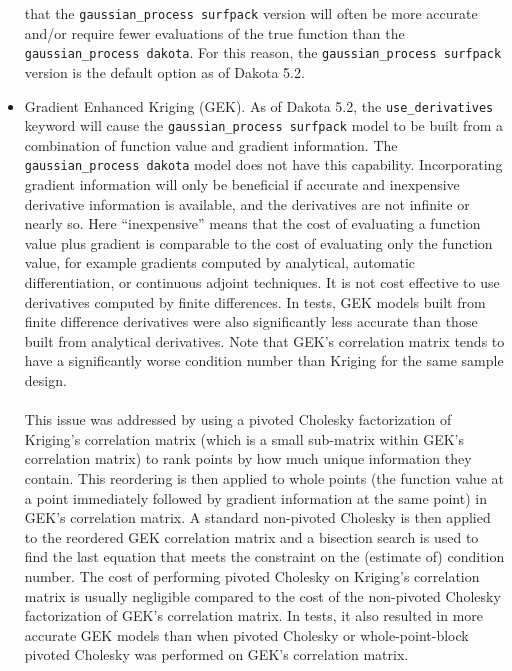 \begin{itemize}
      that the \texttt{gaussian\_process surfpack} version will often be
      more accurate and/or require fewer evaluations of the true function 
      than the \texttt{gaussian\_process dakota}.  For this reason, the
      \texttt{gaussian\_process surfpack} version is the default 
      option as of Dakota 5.2. 
\item Gradient Enhanced Kriging (GEK). As of Dakota 5.2, the 
      \texttt{use\_derivatives}  keyword will cause the 
      \texttt{gaussian\_process surfpack} model to be built from a 
      combination of function value and gradient information.  The 
      \texttt{gaussian\_process dakota} model does not have this 
      capability.  Incorporating gradient information will only be 
      beneficial if accurate and inexpensive derivative information is 
      available, and the derivatives are not infinite or nearly so.  Here 
      ``inexpensive'' means that the cost of evaluating a function value 
      plus gradient is comparable to the cost of evaluating only the 
      function value, for example gradients computed by analytical, 
      automatic differentiation, or continuous adjoint techniques. It is 
      not cost effective to use derivatives computed by finite differences.
      In tests, GEK models built from finite difference derivatives were 
      also significantly less accurate than those built from analytical 
      derivatives.  Note that GEK's correlation matrix tends to have a 
      significantly worse condition number than Kriging for the same 
      sample design.\\ \\
      This issue was addressed by using a pivoted Cholesky 
      factorization of Kriging's correlation matrix (which is a small 
      sub-matrix within GEK's correlation matrix) to rank points by how 
      much unique information they contain. This reordering is then 
      applied to whole points (the function value at a point immediately 
      followed by gradient information at the same point) in GEK's 
      correlation matrix.  A standard non-pivoted Cholesky is then 
      applied to the reordered GEK correlation matrix and a bisection 
      search is used to find the last equation that meets the constraint on 
      the (estimate of) condition number. The cost of performing pivoted
      Cholesky on Kriging's correlation matrix is usually negligible 
      compared to the cost of the non-pivoted Cholesky factorization of 
      GEK's correlation matrix.  In tests, it also resulted in more
      accurate GEK models than when pivoted Cholesky or 
      whole-point-block pivoted Cholesky was performed on GEK's 
      correlation matrix.
\end{itemize}

